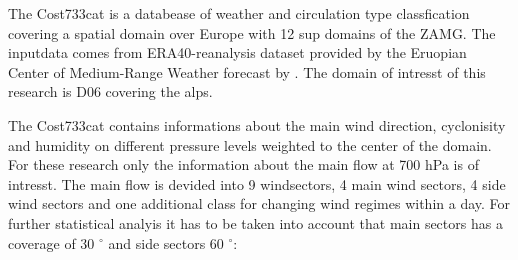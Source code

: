 The Cost733cat is a databease of weather and circulation type classfication covering a spatial domain over Europe with 
12 sup domains of the ZAMG. The inputdata comes from ERA40-reanalysis dataset provided by the Eruopian Center of Medium-Range
Weather forecast by \textcite{philippCost733catDatabaseWeather2010}. The domain of intresst of this research is D06 covering
the alps. 

\noindent The Cost733cat contains informations about the main wind direction, cyclonisity and humidity on different pressure levels
weighted to the center of the domain. For these research only the information about the main flow at 700 hPa is of intresst.
The main flow is devided into 9 windsectors, 4 main wind sectors, 4 side wind sectors and one additional class for changing 
wind regimes within a day. For further statistical analyis it has to be taken into account that main sectors has a coverage of
30 $^{\circ}$ and side sectors 60 $^{\circ}$:
\\

